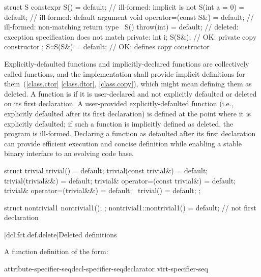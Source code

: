\pnum
\enterexample
\begin{codeblock}
struct S {
  constexpr S() = default;                  // ill-formed: implicit  is not 
  S(int a = 0) = default;                   // ill-formed: default argument
  void operator=(const S&) = default;       // ill-formed: non-matching return type
  ~S() throw(int) = default;                // deleted: exception specification does not match
private:
  int i;
  S(S&);                                    // OK: private copy constructor
};
S::S(S&) = default;                         // OK: defines copy constructor
\end{codeblock}
\exitexample

\pnum
Explicitly-defaulted functions and implicitly-declared functions are collectively
called  functions, and the implementation
shall provide implicit definitions
for them~(\ref{class.ctor}
\ref{class.dtor}, \ref{class.copy}), which might mean defining them as deleted.
A function is
 if it is user-declared and not explicitly
defaulted or deleted on its first declaration. A user-provided explicitly-defaulted function
(i.e., explicitly defaulted after its first declaration)
is defined at the point where it is explicitly defaulted; if such a function is implicitly
defined as deleted, the program is ill-formed.
\enternote
Declaring a function as defaulted after its first declaration can provide
efficient execution and concise
definition while enabling a stable binary interface to an evolving code
base.\exitnote

\pnum
\enterexample

\begin{codeblock}
struct trivial {
  trivial() = default;
  trivial(const trivial&) = default;
  trivial(trivial&&) = default;
  trivial& operator=(const trivial&) = default;
  trivial& operator=(trivial&&) = default;
  ~trivial() = default;
};

struct nontrivial1 {
  nontrivial1();
};
nontrivial1::nontrivial1() = default;           // not first declaration
\end{codeblock}
\exitexample

[dcl.fct.def.delete]{Deleted definitions}%

\pnum
A function definition of the form:

\begin{ncbnf}
    attribute-specifier-seq\opt decl-specifier-seq\opt declarator virt-specifier-seq\opt {}
\end{ncbnf}

